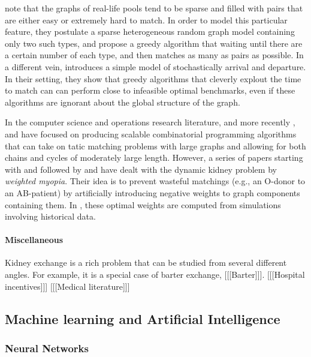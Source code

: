 \documentclass[12pt]{article}
\begin{document}
\cite{ashlagi2013kidney} note that the graphs of real-life pools tend to be sparse and filled with pairs that are either easy or extremely hard to match. In order to model this particular feature, they postulate a sparse heterogeneous random graph model containing only two such types, and propose a greedy algorithm that waiting until there are a certain number of each type, and then matches as many as pairs as possible. In a different vein, \cite{akbarpour2017thickness} introduces a simple model of stochastically arrival and departure. In their setting, they show that greedy algorithms that cleverly explout the time to match can can perform close to infeasible optimal benchmarks, even if these algorithms are ignorant about the global structure of the graph.

In the computer science and operations research literature, \cite{abraham2007clearing} and more recently \cite{anderson2015finding}, \cite{dickerson2016position} and \cite{dickerson2017small} have focused on producing scalable combinatorial programming algorithms that can take on tatic matching problems with large graphs and allowing for both chains and cycles of moderately large length. However, a series of papers starting with \cite{awasthi2009online} and followed by \cite{dickerson2012dynamic} and \cite{dickerson2015futurematch} have dealt with the dynamic kidney problem by \emph{weighted myopia}. Their idea is to prevent wasteful matchings (e.g., an O-donor to an AB-patient) by artificially introducing negative weights to graph components containing them. In \cite{dickerson2015futurematch}, these optimal weights are computed from simulations involving historical data.


\paragraph{Miscellaneous} Kidney exchange is a rich problem that can be studied from several different angles. For example, it is a special case of barter exchange, [[[Barter]]].  [[[Hospital incentives]]] [[[Medical literature]]]



\subsection{Machine learning and Artificial Intelligence}



\subsubsection{Neural Networks}
\end{document}
